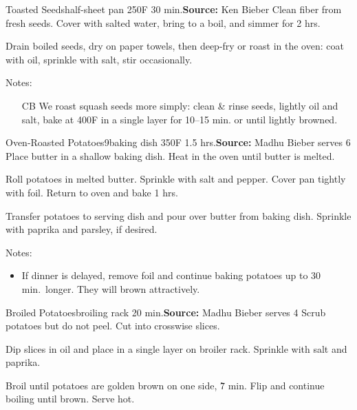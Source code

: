 \begin{recipe}{Toasted Seeds}{half-sheet pan \hfill 250\0F \hfill 30 min.}{\textbf{Source:} Ken Bieber \hfill }
 Clean fiber from fresh seeds. Cover with salted water, bring to a boil, and simmer for 2 hrs.

 \newstep Drain boiled seeds, dry on paper towels, then deep-fry or roast in the oven: coat with oil, sprinkle with salt, stir occasionally.

 \freeform Notes:
 \begin{itemize}
  \item [CB] We roast squash seeds more simply: clean \& rinse seeds, lightly oil and salt, bake at 400\0F in a single layer for 10--15 min. or until lightly browned.
 \end{itemize}
\end{recipe}

\begin{recipe}{Oven-Roasted Potatoes}{9\inch{}\inch baking dish \hfill 350\0F \hfill 1.5 hrs.}{\textbf{Source:} Madhu Bieber \hfill serves 6}
 Place butter in a shallow baking dish. Heat in the oven until butter is melted.

 Roll potatoes in melted butter. Sprinkle with salt and pepper. Cover pan tightly with foil. Return to oven and bake 1 hrs.

 Transfer potatoes to serving dish and pour over butter from baking dish. Sprinkle with paprika and parsley, if desired.

 \freeform Notes:
 \begin{itemize}
  \item If dinner is delayed, remove foil and continue baking potatoes up to 30 min.\ longer. They will brown attractively.
 \end{itemize}
\end{recipe}

\begin{recipe}{Broiled Potatoes}{broiling rack \hfill 20 min.}{\textbf{Source:} Madhu Bieber \hfill serves 4}
 Scrub potatoes but do not peel. Cut into \inch crosswise slices.

 Dip slices in oil and place in a single layer on broiler rack. Sprinkle with salt and paprika.

 \newstep Broil until potatoes are golden brown on one side, \~7 min. Flip and continue boiling until brown. Serve hot.
\end{recipe}


